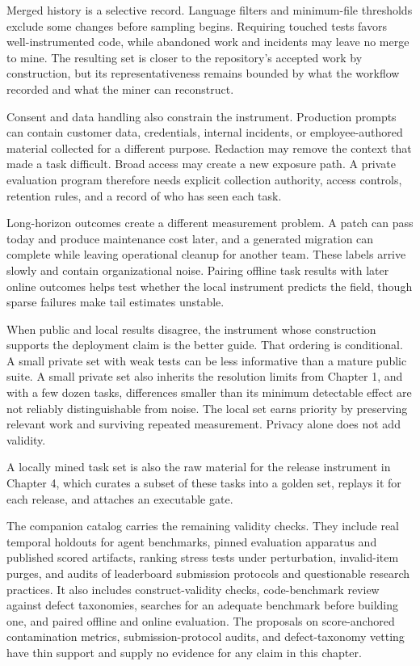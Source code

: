 Merged history is a selective record. Language filters and minimum-file thresholds exclude some changes before sampling begins. Requiring touched tests favors well-instrumented code, while abandoned work and incidents may leave no merge to mine. The resulting set is closer to the repository's accepted work by construction, but its representativeness remains bounded by what the workflow recorded and what the miner can reconstruct.

Consent and data handling also constrain the instrument. Production prompts can contain customer data, credentials, internal incidents, or employee-authored material collected for a different purpose. Redaction may remove the context that made a task difficult. Broad access may create a new exposure path. A private evaluation program therefore needs explicit collection authority, access controls, retention rules, and a record of who has seen each task.

Long-horizon outcomes create a different measurement problem. A patch can pass today and produce maintenance cost later, and a generated migration can complete while leaving operational cleanup for another team. These labels arrive slowly and contain organizational noise. Pairing offline task results with later online outcomes helps test whether the local instrument predicts the field, though sparse failures make tail estimates unstable.

When public and local results disagree, the instrument whose construction supports the deployment claim is the better guide. That ordering is conditional. A small private set with weak tests can be less informative than a mature public suite. A small private set also inherits the resolution limits from Chapter 1, and with a few dozen tasks, differences smaller than its minimum detectable effect are not reliably distinguishable from noise. The local set earns priority by preserving relevant work and surviving repeated measurement. Privacy alone does not add validity.

A locally mined task set is also the raw material for the release instrument in Chapter 4, which curates a subset of these tasks into a golden set, replays it for each release, and attaches an executable gate.

The companion catalog carries the remaining validity checks. They include real temporal holdouts for agent benchmarks, pinned evaluation apparatus and published scored artifacts, ranking stress tests under perturbation, invalid-item purges, and audits of leaderboard submission protocols and questionable research practices. It also includes construct-validity checks, code-benchmark review against defect taxonomies, searches for an adequate benchmark before building one, and paired offline and online evaluation. The proposals on score-anchored contamination metrics, submission-protocol audits, and defect-taxonomy vetting have thin support and supply no evidence for any claim in this chapter.

